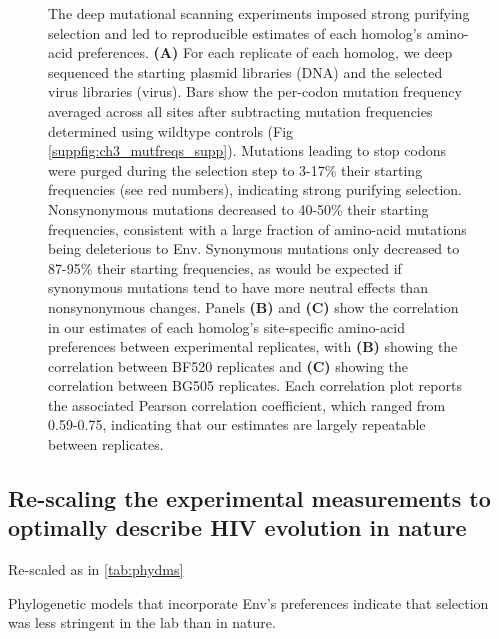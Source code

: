 \documentclass[9pt,lineno]{elife}
\begin{document}
\begin{figure}
\caption{\label{fig:mutfreqs}
The deep mutational scanning experiments imposed strong purifying selection and led to reproducible estimates of each homolog's amino-acid preferences.
{\bf(A)} For each replicate of each homolog, we deep sequenced the starting plasmid libraries (DNA) and the selected virus libraries (virus).
Bars show the per-codon mutation frequency averaged across all sites after subtracting mutation frequencies determined using wildtype controls (Fig \ref{suppfig:ch3_mutfreqs_supp}).
Mutations leading to stop codons were purged during the selection step to 3-17\% their starting frequencies (see red numbers), indicating strong purifying selection.
Nonsynonymous mutations decreased to 40-50\% their starting frequencies, consistent with a large fraction of amino-acid mutations being deleterious to Env.
Synonymous mutations only decreased to 87-95\% their starting frequencies, as would be expected if synonymous mutations tend to have more neutral effects than nonsynonymous changes.
Panels {\bf(B)} and {\bf(C)} show the correlation in our estimates of each homolog's site-specific amino-acid preferences between experimental replicates, with {\bf(B)} showing the correlation between BF520 replicates and {\bf(C)} showing the correlation between BG505 replicates.
Each correlation plot reports the associated Pearson correlation coefficient, which ranged from 0.59-0.75, indicating that our estimates are largely repeatable between replicates.
}
\end{figure}


\subsection*{Re-scaling the experimental measurements to optimally describe HIV evolution in nature}

Re-scaled as in \ref{tab:phydms}

\begin{table}
\begin{fullwidth}
{\centering }
\caption{\label{tab:phydms}
Phylogenetic models that incorporate Env's preferences indicate that selection was less stringent in the lab than in nature.}
\end{fullwidth}
\end{table}
\end{document}
